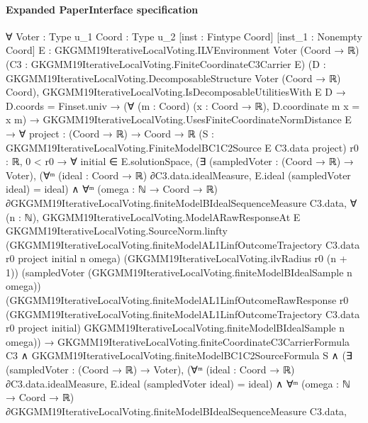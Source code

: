 \documentclass[10pt]{article}
\begin{document}
\paragraph{Expanded PaperInterface specification}
\begin{ReviewVerbatim}
∀ {Voter : Type u_1} {Coord : Type u_2} [inst : Fintype Coord] [inst_1 : Nonempty Coord]
  {E : GKGMM19IterativeLocalVoting.ILVEnvironment Voter (Coord → ℝ)}
  (C3 : GKGMM19IterativeLocalVoting.FiniteCoordinateC3Carrier E)
  (D : GKGMM19IterativeLocalVoting.DecomposableStructure Voter (Coord → ℝ) Coord),
  GKGMM19IterativeLocalVoting.IsDecomposableUtilitiesWith E D →
    D.coords = Finset.univ →
      (∀ (m : Coord) (x : Coord → ℝ), D.coordinate m x = x m) →
        GKGMM19IterativeLocalVoting.UsesFiniteCoordinateNormDistance E →
          ∀ {project : (Coord → ℝ) → Coord → ℝ}
            (S : GKGMM19IterativeLocalVoting.FiniteModelBC1C2Source E C3.data project) {r0 : ℝ},
            0 < r0 →
              ∀ initial ∈ E.solutionSpace,
                (∃ (sampledVoter : (Coord → ℝ) → Voter),
                    (∀ᵐ (ideal : Coord → ℝ) ∂C3.data.idealMeasure, E.ideal (sampledVoter ideal) = ideal) ∧
                      ∀ᵐ (omega : ℕ → Coord → ℝ) ∂GKGMM19IterativeLocalVoting.finiteModelBIdealSequenceMeasure C3.data,
                        ∀ (n : ℕ),
                          GKGMM19IterativeLocalVoting.ModelARawResponseAt E
                            GKGMM19IterativeLocalVoting.SourceNorm.linfty
                            (GKGMM19IterativeLocalVoting.finiteModelAL1LinfOutcomeTrajectory C3.data r0 project initial
                              n omega)
                            (GKGMM19IterativeLocalVoting.ilvRadius r0 (n + 1))
                            (sampledVoter (GKGMM19IterativeLocalVoting.finiteModelBIdealSample n omega))
                            (GKGMM19IterativeLocalVoting.finiteModelAL1LinfOutcomeRawResponse r0
                              (GKGMM19IterativeLocalVoting.finiteModelAL1LinfOutcomeTrajectory C3.data r0 project
                                initial)
                              GKGMM19IterativeLocalVoting.finiteModelBIdealSample n omega)) →
                  GKGMM19IterativeLocalVoting.finiteCoordinateC3CarrierFormula C3 ∧
                    GKGMM19IterativeLocalVoting.finiteModelBC1C2SourceFormula S ∧
                      (∃ (sampledVoter : (Coord → ℝ) → Voter),
                          (∀ᵐ (ideal : Coord → ℝ) ∂C3.data.idealMeasure, E.ideal (sampledVoter ideal) = ideal) ∧
                            ∀ᵐ (omega :
                              ℕ → Coord → ℝ) ∂GKGMM19IterativeLocalVoting.finiteModelBIdealSequenceMeasure C3.data,

\end{ReviewVerbatim}
\end{document}
